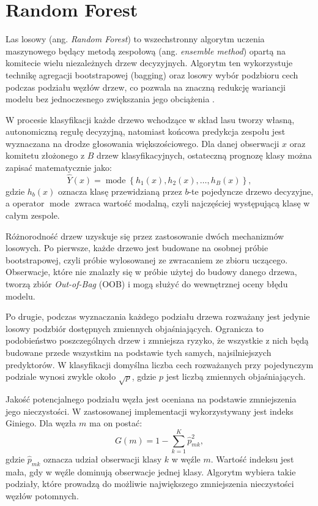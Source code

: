 \documentclass{report}
\begin{document}

\section{Random Forest}
Las losowy (ang. \textit{Random Forest}) to wszechstronny algorytm uczenia maszynowego będący metodą zespołową (ang. \textit{ensemble method}) opartą na komitecie wielu niezależnych drzew decyzyjnych. Algorytm ten wykorzystuje technikę agregacji bootstrapowej (bagging) oraz losowy wybór podzbioru cech podczas podziału węzłów drzew, co pozwala na znaczną redukcję wariancji modelu bez jednoczesnego zwiększania jego obciążenia \cite{breiman2001, hastie2009, koronacki2005}.

W procesie klasyfikacji każde drzewo wchodzące w skład lasu tworzy własną, autonomiczną regułę decyzyjną, natomiast końcowa predykcja zespołu jest wyznaczana na drodze głosowania większościowego. Dla danej obserwacji $x$ oraz komitetu złożonego z $B$ drzew klasyfikacyjnych, ostateczną prognozę klasy można zapisać matematycznie jako:
\[
\hat{Y}(x)=\operatorname{mode}\left\{h_1(x),h_2(x),\ldots,h_B(x)\right\},
\]
gdzie $h_b(x)$ oznacza klasę przewidzianą przez $b$-te pojedyncze drzewo decyzyjne, a operator $\operatorname{mode}$ zwraca wartość modalną, czyli najczęściej występującą klasę w całym zespole.

Różnorodność drzew uzyskuje się przez zastosowanie dwóch mechanizmów losowych. Po pierwsze, każde drzewo jest budowane na osobnej próbie bootstrapowej, czyli próbie wylosowanej ze zwracaniem ze zbioru uczącego. Obserwacje, które nie znalazły się w próbie użytej do budowy danego drzewa, tworzą zbiór \textit{Out-of-Bag} (OOB) i mogą służyć do wewnętrznej oceny błędu modelu.

Po drugie, podczas wyznaczania każdego podziału drzewa rozważany jest jedynie losowy podzbiór dostępnych zmiennych objaśniających. Ogranicza to podobieństwo poszczególnych drzew i zmniejsza ryzyko, że wszystkie z nich będą budowane przede wszystkim na podstawie tych samych, najsilniejszych predyktorów. W klasyfikacji domyślna liczba cech rozważanych przy pojedynczym podziale wynosi zwykle około $\sqrt{p}$, gdzie $p$ jest liczbą zmiennych objaśniających.

Jakość potencjalnego podziału węzła jest oceniana na podstawie zmniejszenia jego nieczystości. W zastosowanej implementacji wykorzystywany jest indeks Giniego. Dla węzła $m$ ma on postać:
\[
G(m)=1-\sum_{k=1}^{K}\hat{p}_{mk}^{2},
\]
gdzie $\hat{p}_{mk}$ oznacza udział obserwacji klasy $k$ w węźle $m$. Wartość indeksu jest mała, gdy w węźle dominują obserwacje jednej klasy. Algorytm wybiera takie podziały, które prowadzą do możliwie największego zmniejszenia nieczystości węzłów potomnych.
\end{document}
